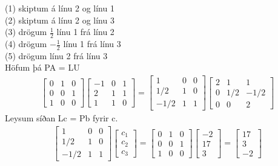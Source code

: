 \documentclass[11pt]{article}
\begin{document}
\noindent(1) skiptum á línu 2 og línu 1\\
(2) skiptum á línu 2 og línu 3\\
(3) drögum $\frac 12$ línu 1 frá línu 2\\
(4) drögum $-\frac 12$ línu 1 frá línu 3\\
(5) drögum línu 2 frá línu 3\\
Höfum þá PA = LU
\begin{align*}
\begin{bmatrix} %
0 & 1 & 0\\
0 & 0 & 1\\
1 & 0 & 0
\end{bmatrix}
\begin{bmatrix} %
-1 & 0 & 1\\
2  & 1 & 1\\
1  & 1 & 0
\end{bmatrix}
=
\begin{bmatrix} %
1 & 0 & 0\\
1/2 & 1 & 0\\
-1/2 & 1 & 1
\end{bmatrix}
\begin{bmatrix} %
2 & 1 & 1\\
0 & 1/2 & -1/2\\
0 & 0 & 2
\end{bmatrix}
\end{align*}
Leysum síðan Lc = Pb fyrir c.
\begin{align*}
\begin{bmatrix} %
1 & 0 & 0\\
1/2 & 1 & 0\\
-1/2 & 1 & 1
\end{bmatrix}
\begin{bmatrix}
c_1\\
c_2\\
c_3
\end{bmatrix}
=
\begin{bmatrix} %
0 & 1 & 0\\
0 & 0 & 1\\
1 & 0 & 0
\end{bmatrix}
\begin{bmatrix}
-2\\
17\\
3
\end{bmatrix}
=
\begin{bmatrix}
17\\
3\\
-2
\end{bmatrix}
\end{align*}
\end{document}
